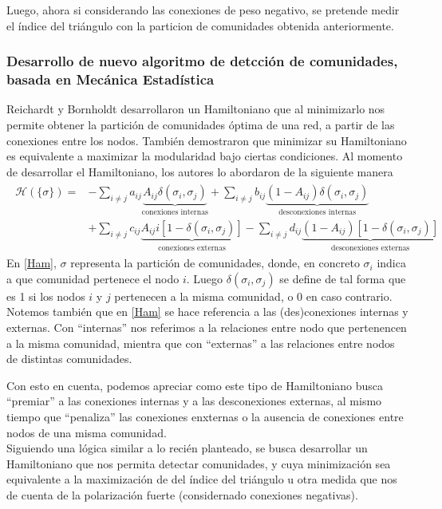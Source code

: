 \documentclass{proyectotesis}
\begin{document}
Luego, ahora si considerando las conexiones de peso negativo, se pretende medir el índice del triángulo con la particion de comunidades obtenida anteriormente.

\subsubsection{Desarrollo de nuevo algoritmo de detcción de comunidades, basada en Mecánica Estadística} 
Reichardt y Bornholdt desarrollaron un Hamiltoniano que al minimizarlo nos permite obtener la partición de comunidades óptima de una red, a partir de las conexiones entre los nodos. También demostraron que minimizar su Hamiltoniano es equivalente a maximizar la modularidad bajo ciertas condiciones. 
Al momento de desarrollar el Hamiltoniano, los autores lo abordaron de la siguiente manera
\begin{align}
\begin{split}
    \mathcal{H}(\{\sigma\}) = &- \sum_{i\neq j} a_{ij}\underbrace{A_{ij}\delta(\sigma_i,\sigma_j)}_{\text{conexiones internas}} + \sum_{i\neq j} b_{ij}\underbrace{(1 - A_{ij})\delta(\sigma_i,\sigma_j)}_{\text{desconexiones internas}} \\
                              &+ \sum_{i\neq j} c_{ij} \underbrace{A_{ij}i[1 - \delta(\sigma_i,\sigma_j)] }_{\text{conexiones externas}} - \sum_{i\neq j} d_{ij} \underbrace{(1-A_{ij})[1 - \delta(\sigma_i,\sigma_j)]}_{\text{desconexiones externas}}
\end{split}
\label{Ham}
\end{align}
En \eqref{Ham}, $\sigma$ representa la partición de comunidades, donde, en concreto $\sigma_i$ indica a que comunidad pertenece el nodo $i$. Luego $\delta(\sigma_i,\sigma_j)$ se define de tal forma que es 1 si los nodos $i$ y $j$ pertenecen a la misma comunidad, o 0 en caso contrario. Notemos también que en \eqref{Ham} se hace referencia a las (des)conexiones internas y externas. Con ``internas'' nos referimos a la relaciones entre nodo que pertenencen a la misma comunidad, mientra que con ``externas'' a las relaciones entre nodos de distintas comunidades.

Con esto en cuenta, podemos apreciar como este tipo de Hamiltoniano busca ``premiar'' a las conexiones internas y a las desconexiones externas, al mismo tiempo que ``penaliza'' las conexiones enxternas o la ausencia de conexiones entre nodos de una misma comunidad.
\\

Siguiendo una lógica similar a lo recién planteado, se busca desarrollar un Hamiltoniano que nos permita detectar comunidades, y cuya minimización sea equivalente a la maximización de del índice del triángulo u otra medida que nos de cuenta de la polarización fuerte (considernado conexiones negativas).
\end{document}
